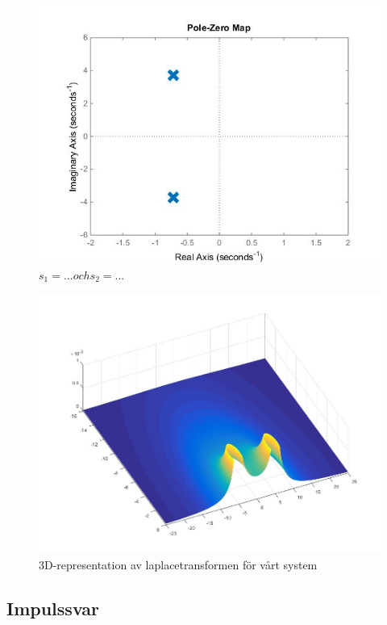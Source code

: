 \documentclass[10pt,a4paper]{article}
\begin{document}
\begin{figure}[h]
\begin{center}
\includegraphics[scale=0.4]{nolpol-diagram}
\caption{$s_1 = ... och s_2 = ...$}
\end{center}
\end{figure}
\begin{figure}[h]
\begin{center}
\includegraphics[scale=0.25]{3Dpoler4}
\caption{3D-representation av laplacetransformen för vårt system}
\end{center}
\end{figure}

\newpage


\subsection{Impulssvar}
\end{document}
